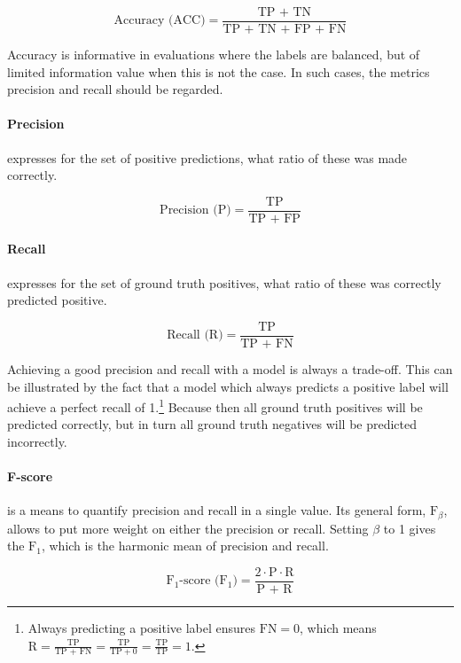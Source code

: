 \begin{equation*}
\text{Accuracy (ACC)} = \frac{\text{TP + TN}}{\text{TP + TN + FP + FN}}
\end{equation*}

Accuracy is informative in evaluations where the labels are balanced, but of limited information value when this is not the case. In such cases, the metrics precision and recall should be regarded.

\paragraph{Precision} expresses for the set of positive predictions, what ratio of these was made correctly.

\begin{equation*}
\text{Precision (P)} = \frac{\text{TP}}{\text{TP + FP}}
\end{equation*}

\paragraph{Recall} expresses for the set of ground truth positives, what ratio of these was correctly predicted positive.

\begin{equation*}
\text{Recall (R)} = \frac{\text{TP}}{\text{TP + FN}}
\end{equation*}

Achieving a good precision and recall with a model is always a trade-off. This can be illustrated by the fact that a model which always predicts a positive label will achieve a perfect recall of 1.\footnote{Always predicting a positive label ensures $\text{FN} = 0$, which means $\text{R} = \frac{\text{TP}}{\text{TP + FN}} = \frac{\text{TP}}{\text{TP} + 0} = \frac{\text{TP}}{\text{TP}} = 1$.} Because then all ground truth positives will be predicted correctly, but in turn all ground truth negatives will be predicted incorrectly.

\paragraph{F-score}
is a means to quantify precision and recall in a single value. Its general form, $\text{F}_\beta$, allows to put more weight on either the precision or recall. Setting $\beta$ to 1 gives the $\text{F}_1$, which is the harmonic mean of precision and recall.

\begin{equation*}
\text{$\text{F}_1$-score ($\text{F}_1$)} = \frac{2 \cdot \text{P} \cdot \text{R}}{\text{P + R}}
\end{equation*}

